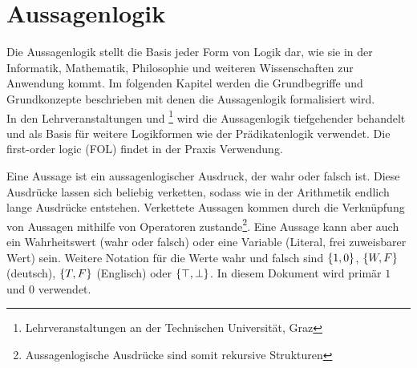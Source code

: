 \chapter{Aussagenlogik}
\label{sec:propositional_logic}
\newcommand{\BOOL}{\text{BOOL}}
\newcommand{\T}{1}
\newcommand{\F}{0}
\newcommand{\f}{f_\arabic{bfunc}}
%
%
Die Aussagenlogik stellt die Basis jeder Form von Logik dar, wie sie in der Informatik, Mathematik, Philosophie und weiteren Wissenschaften zur Anwendung kommt. Im folgenden Kapitel werden die Grundbegriffe und Grundkonzepte beschrieben mit denen die Aussagenlogik formalisiert wird. \\
In den Lehrveranstaltungen \coursedm{} und \courselc{}\footnote{Lehrveranstaltungen an der Technischen Universität, Graz} wird die Aussagenlogik tiefgehender behandelt und als Basis für weitere Logikformen wie der Prädikatenlogik verwendet. Die first-order logic (FOL) findet in der Praxis Verwendung.

Eine Aussage ist ein aussagenlogischer Ausdruck, der wahr oder falsch ist. Diese Ausdrücke lassen sich beliebig verketten, sodass wie in der Arithmetik endlich lange Ausdrücke entstehen. Verkettete Aussagen kommen durch die Verknüpfung von Aussagen mithilfe von Operatoren zustande\footnote{Aussagenlogische Ausdrücke sind somit rekursive Strukturen}. Eine Aussage kann aber auch ein Wahrheitswert (wahr oder falsch) oder eine Variable (Literal, frei zuweisbarer Wert) sein. Weitere Notation für die Werte wahr und falsch sind $\left\{1, 0\right\}$, $\left\{W, F\right\}$ (deutsch), $\left\{T, F\right\}$ (Englisch) oder $\left\{\top, \bot\right\}$. In diesem Dokument wird primär $\T$ und $\F$ verwendet.

